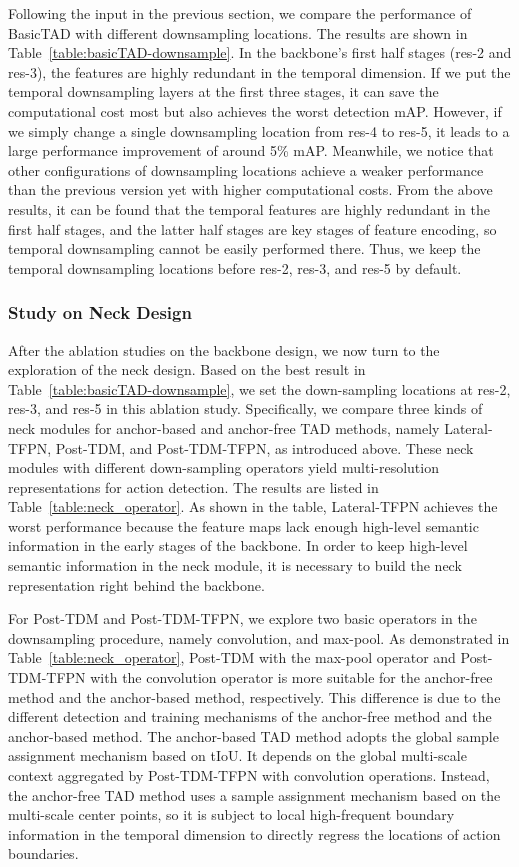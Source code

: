 \documentclass[a4paper,fleqn]{cas-dc}
\begin{document}
Following the input in the previous section, we compare the performance of BasicTAD with different downsampling locations. The results are shown in Table~\ref{table:basicTAD-downsample}. 
In the backbone's first half stages (res-2 and res-3), the features are highly redundant in the temporal dimension. If we put the temporal downsampling layers at the first three stages, it can save the computational cost most but also achieves the worst detection mAP. However, if we simply change a single downsampling location from res-4 to res-5, it leads to a large performance improvement of around 5\% mAP. Meanwhile, we notice that other configurations of downsampling locations achieve a weaker performance than the previous version yet with higher computational costs. 
From the above results, it can be found that the temporal features are highly redundant in the first half stages, and the latter half stages are key stages of feature encoding, so temporal downsampling cannot be easily performed there.
Thus, we keep the temporal downsampling locations before res-2, res-3, and res-5 by default.




\subsubsection{Study on Neck Design} 
After the ablation studies on the backbone design, we now turn to the exploration of the neck design.
Based on the best result in Table~\ref{table:basicTAD-downsample}, we set the down-sampling locations at res-2, res-3, and res-5 in this ablation study.
Specifically, we compare three kinds of neck modules for anchor-based and anchor-free TAD methods, namely Lateral-TFPN, Post-TDM, and Post-TDM-TFPN, as introduced above. These neck modules with different down-sampling operators yield multi-resolution representations for action detection. The results are listed in Table~\ref{table:neck_operator}.
As shown in the table, Lateral-TFPN achieves the worst performance because the feature maps lack enough high-level semantic information in the early stages of the backbone.
In order to keep high-level semantic information in the neck module, it is necessary to build the neck representation right behind the backbone.

For Post-TDM and Post-TDM-TFPN, we explore two basic operators in the downsampling procedure, namely convolution, and max-pool. As demonstrated in Table~\ref{table:neck_operator}, Post-TDM with the max-pool operator and Post-TDM-TFPN with the convolution operator is more suitable for the anchor-free method and the anchor-based method, respectively.
This difference is due to the different detection and training mechanisms of the anchor-free method and the anchor-based method.
The anchor-based TAD method adopts the global sample assignment mechanism based on tIoU. 
It depends on the global multi-scale context aggregated by Post-TDM-TFPN with convolution operations. 
Instead, the anchor-free TAD method uses a sample assignment mechanism based on the multi-scale center points, so it is subject to local high-frequent boundary information in the temporal dimension to directly regress the locations of action boundaries.
\end{document}
